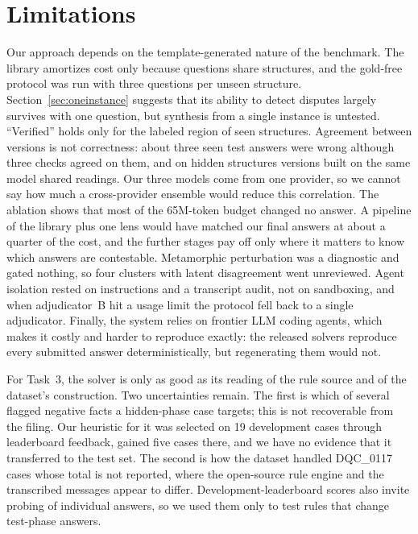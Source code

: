 \documentclass[conference]{IEEEtran}
\begin{document}
\section{Limitations}
Our approach depends on the template-generated nature of the benchmark. The library amortizes cost only because
questions share structures, and the gold-free protocol was run with three questions per unseen structure.
Section~\ref{sec:oneinstance} suggests that its ability to detect disputes largely survives with one question, but
synthesis from a single instance is untested. ``Verified'' holds only for the labeled region of seen structures.
Agreement between versions is not correctness: about three seen test answers were wrong although three checks agreed
on them, and on hidden structures versions built on the same model shared readings. Our three models come from one
provider, so we cannot say how much a cross-provider ensemble would reduce this correlation. The ablation shows that
most of the 65M-token budget changed no answer. A pipeline of the library plus one lens would have matched our final
answers at about a quarter of the cost, and the further stages pay off only where it matters to know which answers
are contestable. Metamorphic perturbation was a diagnostic and gated nothing, so four clusters with latent
disagreement went unreviewed. Agent isolation rested on instructions and a transcript audit, not on sandboxing, and
when adjudicator~B hit a usage limit the protocol fell back to a single adjudicator. Finally, the system relies on
frontier LLM coding agents, which makes it costly and harder to reproduce exactly: the released solvers reproduce every
submitted answer deterministically, but regenerating them would not.

For Task~3, the solver is only as good as its reading of the rule source and of the dataset's construction. Two
uncertainties remain. The first is which of several flagged negative facts a hidden-phase case targets; this is not
recoverable from the filing. Our heuristic for it was selected on 19 development cases through leaderboard feedback,
gained five cases there, and we have no evidence that it transferred to the test set. The second is how the dataset handled
DQC\_0117 cases whose total is not reported, where the open-source rule engine and the transcribed messages appear to
differ. Development-leaderboard scores also invite probing of individual answers, so we used them only to test rules
that change test-phase answers.
\end{document}
